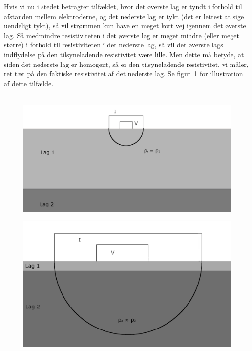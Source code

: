 %
Hvis vi nu i stedet betragter tilfældet, hvor det øverste lag er tyndt i forhold til afstanden mellem elektroderne, og det nederste lag er tykt (det er lettest at sige uendeligt tykt), så vil strømmen kun have en meget kort vej igennem det øverste lag. Så medmindre resistiviteten i det øverste lag er meget mindre (eller meget større) i forhold til resistiviteten i det nederste lag, så vil det øverste lags indflydelse på den tilsyneladende resistivitet være lille. Men dette må betyde, at siden det nederste lag er homogent, så er den tilsyneladende resistivitet, vi måler, ret tæt på den faktiske resistivitet af det nederste lag. Se figur~\ref{fig:geo_ex2} for illustration af dette tilfælde.\\ \\
%
%
\begin{figure} [h!]
\centering
\begin{minipage}{.95\textwidth}
    \centering
    \includegraphics[width = .75\linewidth]{Geo/Figurer/geo_ex1.pdf}
    \label{fig:geo_ex1}
\end{minipage}
\begin{minipage}{.95\textwidth}
    \centering
    \includegraphics[width = .75\linewidth]{Geo/Figurer/geo_ex2.pdf}
    \label{fig:geo_ex2}
\end{minipage}
\end{figure}
